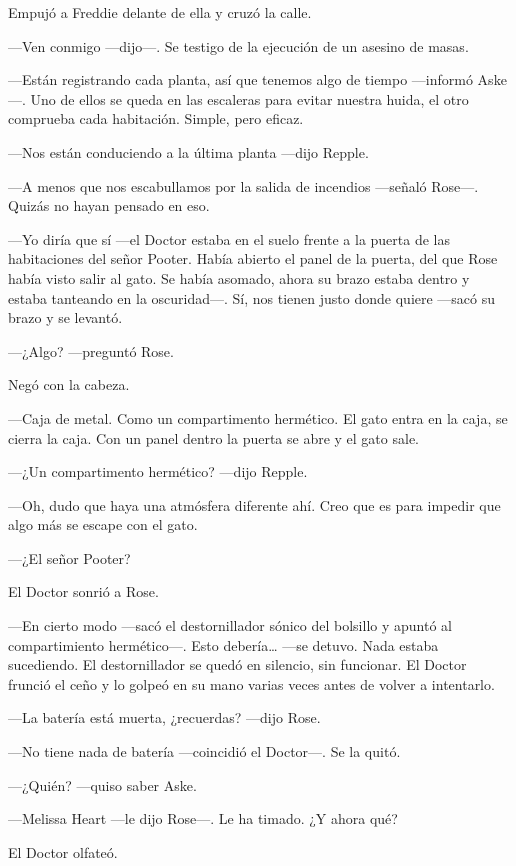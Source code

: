 {Empujó a Freddie delante de ella y cruzó la calle. }

{---Ven conmigo ---dijo---. Se testigo de la ejecución de un asesino de
masas.}

{---Están registrando cada planta, así que tenemos algo de tiempo
	---informó Aske---. Uno de ellos se queda en las escaleras para evitar
nuestra huida, el otro comprueba cada habitación. Simple, pero eficaz.}

{---Nos están conduciendo a la última planta ---dijo Repple.}

{---A menos que nos escabullamos por la salida de incendios ---señaló
Rose---. Quizás no hayan pensado en eso.}

{---Yo diría que sí ---el Doctor estaba en el suelo frente a la puerta
	de las habitaciones del señor Pooter. Había abierto el panel de la
	puerta, del que Rose había visto salir al gato. Se había asomado, ahora
	su brazo estaba dentro y estaba tanteando en la oscuridad---. Sí, nos
tienen justo donde quiere ---sacó su brazo y se levantó. }

{---¿Algo? ---preguntó Rose. }

{Negó con la cabeza. }

{---Caja de metal. Como un compartimento hermético. El gato entra en la
	caja, se cierra la caja. Con un panel dentro la puerta se abre y el gato
sale.}

{---¿Un compartimento hermético? ---dijo Repple. }

{---Oh, dudo que haya una atmósfera diferente ahí. Creo que es para
impedir que algo más se escape con el gato.}

{---¿El señor Pooter?}

{El Doctor sonrió a Rose. }

{---En cierto modo ---sacó el destornillador sónico del bolsillo y
	apuntó al compartimiento hermético---. Esto debería\ldots{} ---se
	detuvo. Nada estaba sucediendo. El destornillador se quedó en silencio,
	sin funcionar. El Doctor frunció el ceño y lo golpeó en su mano varias
veces antes de volver a intentarlo.}

{---La batería está muerta, ¿recuerdas? ---dijo Rose. }

{---No tiene nada de batería ---coincidió el Doctor---. Se la quitó. }

{---¿Quién? ---quiso saber Aske. }

{---Melissa Heart ---le dijo Rose---. Le ha timado. ¿Y ahora qué?}

{El Doctor olfateó. }

